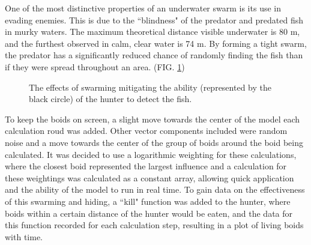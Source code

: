 \documentclass[
reprint,
showpacs,preprintnumbers,
amsmath,amssymb,
prl,
]{revtex4-1}
\begin{document}
One of the most distinctive properties of an underwater swarm is its use in evading enemies.
This is due to the ``blindness" of the predator and predated fish in murky waters.
The maximum theoretical distance visible underwater is 80 m, and the furthest observed in calm, clear water is 74 m.\cite{underwatervision}
By forming a tight swarm, the predator has a significantly reduced chance of randomly finding the fish than if they were spread throughout an area. (FIG. \ref{fig:swarmblindness})

\begin{figure}[!htp]
		\centering
		
	\caption{The effects of swarming mitigating the ability (represented by the black circle) of the hunter to detect the fish.\cite{underwatervision}}

	\label{fig:swarmblindness}
\end{figure}

To keep the boids on screen, a slight move towards the center of the model each calculation roud was added.
Other vector components included were random noise and a move towards the center of the group of boids around the boid being calculated.
It was decided to use a logarithmic weighting for these calculations, where the closest boid represented the largest influence and a calculation for these weightings was calculated as a constant array, allowing quick application and the ability of the model to run in real time.
To gain data on the effectiveness of this swarming and hiding, a ``kill" function was added to the hunter, where boids within a certain distance of the hunter would be eaten, and the data for this function recorded for each calculation step, resulting in a plot of living boids with time.
\end{document}
